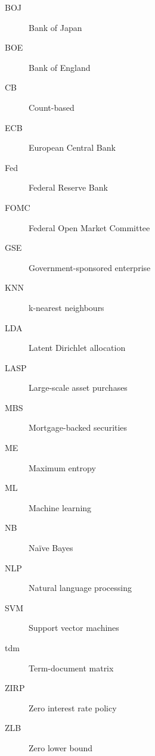 %
\begin{description}
	\item[BOJ] Bank of Japan
	\item[BOE] Bank of England
	\item[CB] Count-based
	\item[ECB] European Central Bank
	\item[Fed] Federal Reserve Bank
	\item[FOMC] Federal Open Market Committee
	\item[GSE] Government-sponsored enterprise
	\item[KNN] k-nearest neighbours
	\item[LDA] Latent Dirichlet allocation
	\item[LASP] Large-scale asset purchases
	\item[MBS] Mortgage-backed securities
	\item[ME] Maximum entropy
	\item[ML] Machine learning
	\item[NB] Na\"{i}ve Bayes
	\item[NLP] Natural language processing
	\item[SVM] Support vector machines
	\item[tdm] Term-document matrix
	\item[ZIRP] Zero interest rate policy
	\item[ZLB] Zero lower bound
\end{description}